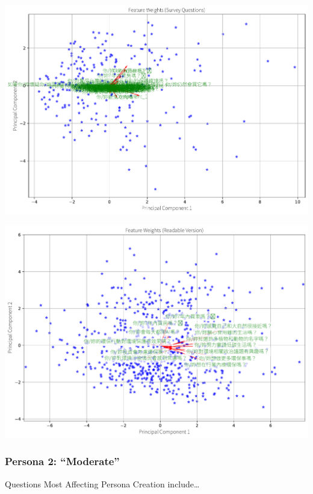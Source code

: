 \documentclass[
  letterpaper,
  DIV=11,
  numbers=noendperiod]{scrartcl}
\begin{document}
\includegraphics{_thesis_files/figure-pdf/cell-79-output-3.pdf}

\includegraphics{_thesis_files/figure-pdf/cell-79-output-4.pdf}

\subsubsection{Persona 2: ``Moderate''}\label{persona-2-moderate}

Questions Most Affecting Persona Creation include\ldots{}
\end{document}
